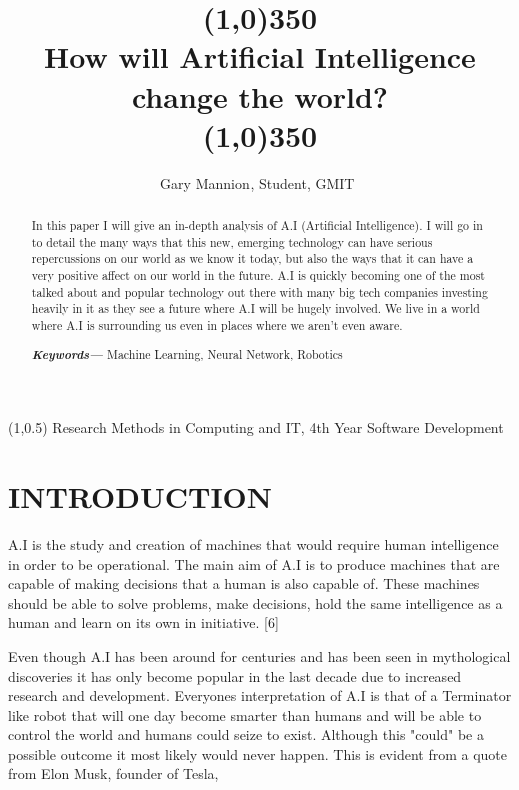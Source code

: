 \documentclass[letterpaper, 10 pt, conference]{ieeeconf}  %
\title{\line(1,0){350}\\How will Artificial Intelligence change the world?\\\line(1,0){350}}
\author{Gary Mannion$^{}$, Student, GMIT $^{}$%
}
\begin{document}
\begin{textblock}{9}(1,0.5)
\noindent\small Research Methods in Computing and IT, 4th Year Software Development
\end{textblock}


\maketitle
\thispagestyle{empty}
\pagestyle{empty}


\begin{abstract} \newline
In this paper I will give an in-depth analysis of A.I (Artificial Intelligence). I will go in to detail the many ways that this new, emerging technology can have serious repercussions on our world as we know it today, but also the ways that it can have a very positive affect on our world in the future. A.I is quickly becoming one of the most talked about and popular technology out there with many big tech companies investing heavily in it as they see a future where A.I will be hugely involved. We live in a world where A.I is surrounding us even in places where we aren't even aware. \vspace{2mm}

\textbf{\textit{Keywords---}} Machine Learning, Neural Network, Robotics
\end{abstract}


\section{INTRODUCTION}

A.I is the study and creation of machines that would require human intelligence in order to be operational. The main aim of A.I is to produce machines that are capable of making decisions that a human is also capable of. These machines should be able to solve problems, make decisions, hold the same intelligence as a human and learn on its own in initiative. [6]

Even though A.I has been around for centuries and has been seen in mythological discoveries it has only become popular in the last decade due to increased research and development. Everyones interpretation of A.I is that of a Terminator like robot that will one day become smarter than humans and will be able to control the world and humans could seize to exist. Although this "could" be a possible outcome it most likely would never happen. This is evident from a quote from Elon Musk, founder of Tesla,
\end{document}
